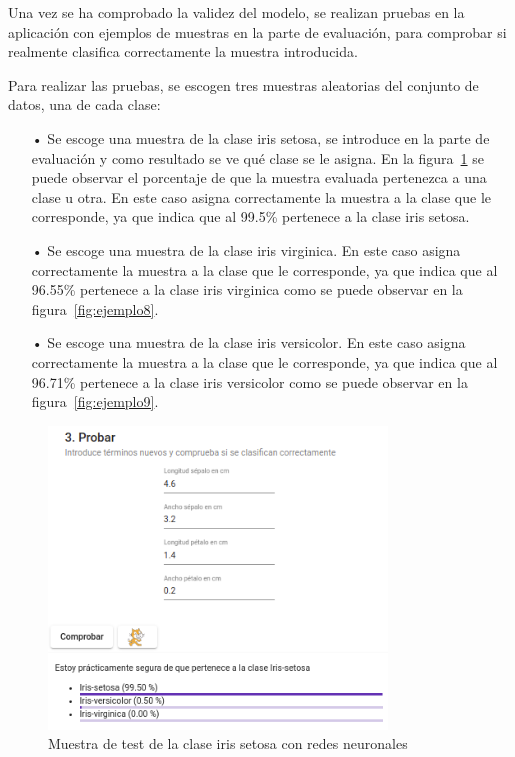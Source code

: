 \documentclass[a4paper, 12pt]{book}
\begin{document}
Una vez se ha comprobado la validez del modelo, se realizan pruebas en la aplicación con ejemplos de muestras en la parte de evaluación, para comprobar si realmente clasifica correctamente la muestra introducida. 

Para realizar las pruebas, se escogen tres muestras aleatorias del conjunto de datos, una de cada clase:
\begin{itemize}

\item[•] Se escoge una muestra de la clase iris setosa, se introduce en la parte de evaluación y como resultado se ve qué clase se le asigna. En la figura~\ref{fig:ejemplo7} se puede observar el porcentaje de que la muestra evaluada pertenezca a una clase u otra. En este caso asigna correctamente la muestra a la clase que le corresponde, ya que indica que al 99.5\% pertenece a la clase iris setosa. 

\item[•] Se escoge una muestra de la clase iris virginica. En este caso asigna correctamente la muestra a la clase que le corresponde, ya que indica que al 96.55\% pertenece a la clase iris virginica como se puede observar en la figura~\ref{fig:ejemplo8}.

\item[•] Se escoge una muestra de la clase iris versicolor. En este caso asigna correctamente la muestra a la clase que le corresponde, ya que indica que al 96.71\% pertenece a la clase iris versicolor como se puede observar en la figura~\ref{fig:ejemplo9}.
\end{itemize}

\begin{figure}
	\centering
	\includegraphics[width=9cm, keepaspectratio]{img/iris_set_num_rn.png}
	\caption{Muestra de test de la clase iris setosa con redes neuronales} 	\label{fig:ejemplo7}
\end{figure}
\end{document}
